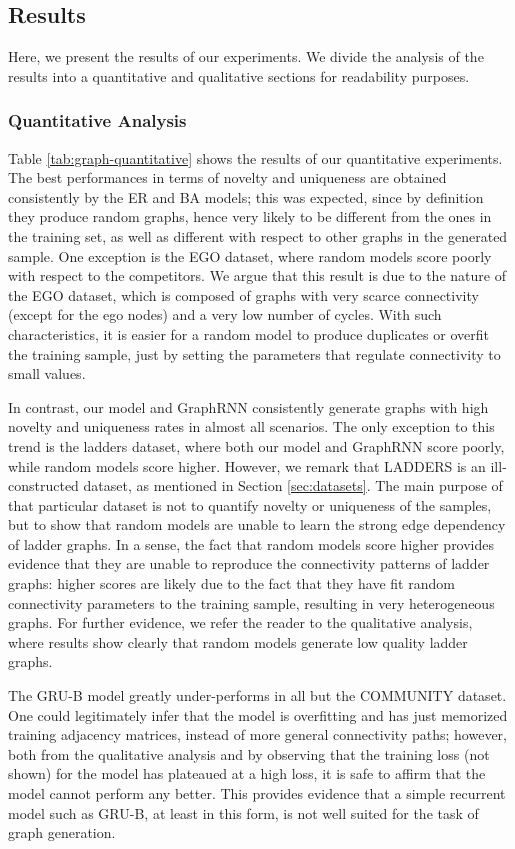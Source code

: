 \subsection{Results}
Here, we present the results of our experiments. We divide the analysis of the results into a quantitative and qualitative sections for readability purposes.

\subsubsection*{Quantitative Analysis}
Table \ref{tab:graph-quantitative} shows the results of our quantitative experiments. The best performances in terms of novelty and uniqueness are obtained consistently by the ER and BA models; this was expected, since by definition they produce random graphs, hence very likely to be different from the ones in the training set, as well as different with respect to other graphs in the generated sample. One exception is the EGO dataset, where random models score poorly with respect to the competitors. We argue that this result is due to the nature of the EGO dataset, which is composed of graphs with very scarce connectivity (except for the ego nodes) and a very low number of cycles. With such characteristics, it is easier for a random model to produce duplicates or overfit the training sample, just by setting the parameters that regulate connectivity to small values.

In contrast, our model and GraphRNN consistently generate graphs with high novelty and uniqueness rates in almost all scenarios. The only exception to this trend is the ladders dataset, where both our model and GraphRNN score poorly, while random models score higher. However, we remark that LADDERS is an ill-constructed dataset, as mentioned in Section \ref{sec:datasets}. The main purpose of that particular dataset is not to quantify novelty or uniqueness of the samples, but to show that random models are unable to learn the strong edge dependency of ladder graphs. In a sense, the fact that random models score higher provides evidence  that they are unable to reproduce the connectivity patterns of ladder graphs: higher scores are likely due to the fact that they have fit random connectivity parameters to the training sample, resulting in very heterogeneous graphs. For further evidence, we refer the reader to the qualitative analysis, where results show clearly that random models generate low quality ladder graphs.

The GRU-B model greatly under-performs in all but the COMMUNITY dataset. One could legitimately infer that the model is overfitting and has just memorized training adjacency matrices, instead of more general connectivity paths; however, both from the qualitative analysis and by observing that the training loss (not shown) for the model has plateaued at a high loss, it is safe to affirm that the model cannot perform any better. This provides evidence that a simple recurrent model such as GRU-B, at least in this form, is not well suited for the task of graph generation.

